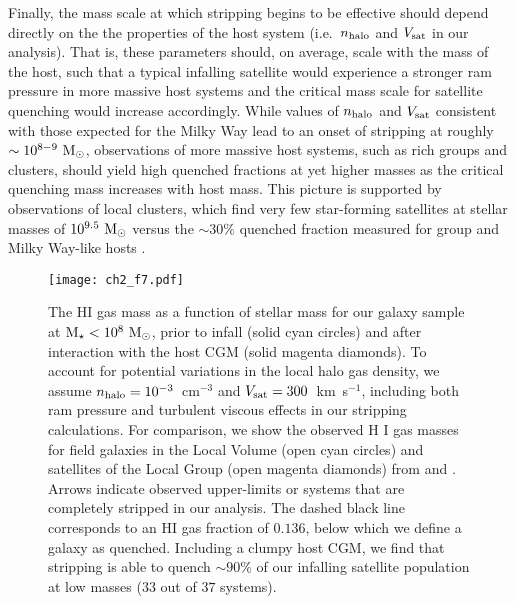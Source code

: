 Finally, the mass scale at which stripping begins to be effective
should depend directly on the the properties of the host system
(i.e.~$n_{\rm halo}$ and $V_{\rm sat}$ in our analysis).
%
That is, these parameters should, on average, scale with the mass of
the host, such that a typical infalling satellite would experience a
stronger ram pressure in more massive host systems and the critical
mass scale for satellite quenching would increase accordingly.
%
While values of $n_{\rm halo}$ and $V_{\rm sat}$ consistent with those
expected for the Milky Way lead to an onset of stripping at roughly
$\sim10^{8-9}~{\rm M}_{\odot}$, observations of more massive host systems, such
as rich groups and clusters, should yield high quenched fractions at
yet higher masses as the critical quenching mass increases with host
mass.
%
This picture is supported by observations of local clusters, which
find very few star-forming satellites at stellar masses of
$10^{9.5}~{\rm M}_{\odot}$ versus the $\sim 30\%$ quenched fraction measured for
group and Milky Way-like hosts \citep[e.g.][]{smith12, boselli14b,
  phillips15a, sj16}.



\begin{figure}
 \centering
 \hspace*{-0.2in}
   \texttt{[image: ch2\_f7.pdf]}
   \caption{The H{\scriptsize I} gas mass as a function of stellar
     mass for our galaxy sample at ${\rm M}_{\star} < 10^{8}~{\rm M}_{\odot}$, prior to
     infall (solid cyan circles) and after interaction with the host
     CGM (solid magenta diamonds). To account for potential variations
     in the local halo gas density, we assume $n_{\rm halo} =
     10^{-3}$~cm$^{-3}$ and $V_{\rm sat} = 300$~km~s$^{-1}$, including
     both ram pressure and turbulent viscous effects in our stripping
     calculations. For comparison, we show the observed H{\scriptsize
       I} gas masses for field galaxies in the Local Volume (open cyan
     circles) and satellites of the Local Group (open magenta
     diamonds) from \citet{mcconnachie12} and
     \citet{spekkens14}. Arrows indicate observed upper-limits or
     systems that are completely stripped in our analysis. The dashed
     black line corresponds to an H{\scriptsize I} gas fraction of
     $0.136$, below which we define a galaxy as quenched. Including a
     clumpy host CGM, we find that stripping is able to quench
     $\sim90\%$ of our infalling satellite population at low masses
     ($33$ out of $37$ systems).}
 \label{fig:gasfrac}
\end{figure}


